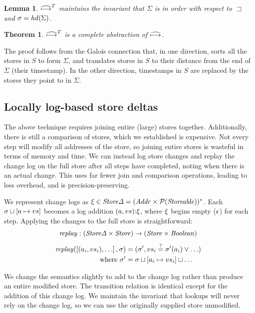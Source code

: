 \documentclass[preprint,onecolumn,9pt]{sigplanconf} %
\newtheorem{theorem}{Theorem}
\newtheorem{lemma}{Lemma}
\begin{document}
\begin{lemma}
  $\widehat{\mathbin{\longmapsto}}^T$ maintains the invariant that $\Sigma$ is in
  order with respect to $\sqsupset$ and $\sigma = \mathit{hd}(\Sigma)$.
\end{lemma}

\begin{theorem}
$\widehat{\mathbin{\longmapsto}}^T$ is a complete abstraction of $\widehat{\mathbin{\longmapsto}}$.
\end{theorem}
The proof follows from the Galois connection that, in one direction,
sorts all the stores in $S$ to form $\Sigma$, and translates stores in
$S$ to their distance from the end of $\Sigma$ (their timestamp). In the other
direction, timestamps in $S$ are replaced by the stores they point to in $\Sigma$.

\subsection{Locally log-based store deltas}

The above technique requires joining entire (large) stores
together. Additionally, there is still a comparison of stores, which
we established is expensive. Not every step will modify all addresses
of the store, so joining entire stores is wasteful in terms of memory
and time. We can instead log store changes and replay the change log
on the full store after all steps have completed, noting when there is
an actual change. This uses far fewer join and comparison operations,
leading to less overhead, and is precision-preserving.

We represent change logs as $\xi \in \mathit{Store\Delta} = (\mathit{Addr} \times
  \mathcal{P}(\mathit{Storeable}))^*$. Each $\sigma\sqcup[a \mapsto v{s}]$
 becomes a log addition
$(a, v{s}) {\tt :} \xi$, where $\xi$ begins
empty ($\epsilon$) for each step. Applying the changes to the full store
is straightforward:
\begin{equation*}
\mathit{replay} : (\mathit{Store\Delta} \times \mathit{Store}) \to (\mathit{Store} \times \mathit{Boolean})
\end{equation*}
\begin{align*}
\mathit{replay}(\left[ (a_i, v{s_i}), \ldots\right], \sigma) &=
(\sigma', v{s_i} \overset{?}{=} \sigma'(a_i) \vee \ldots) \\
\text{ where } \sigma' &= {\sigma \sqcup [a_i \mapsto v{s_i}] \sqcup \ldots}
\end{align*}

We change the semantics slightly to add to the change log rather than
produce an entire modified store.  The transition relation is
identical except for the addition of this change log.  We maintain the
invariant that lookups will never rely on the change log, so we can
use the originally supplied store unmodified.
\end{document}
